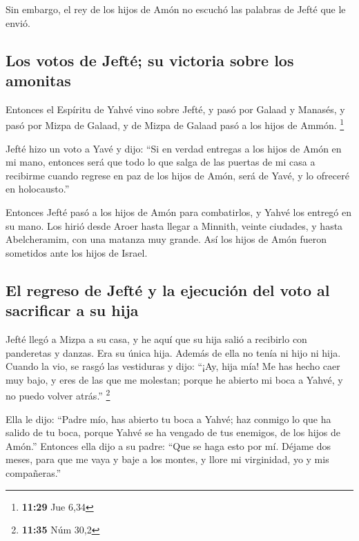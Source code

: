  Sin embargo, el rey de los hijos de Amón no escuchó las
palabras de Jefté que le envió.

\hypertarget{los-votos-de-jeftuxe9-su-victoria-sobre-los-amonitas}{%
\subsection{Los votos de Jefté; su victoria sobre los
amonitas}\label{los-votos-de-jeftuxe9-su-victoria-sobre-los-amonitas}}

 Entonces el Espíritu de Yahvé vino sobre Jefté, y pasó
por Galaad y Manasés, y pasó por Mizpa de Galaad, y de Mizpa de Galaad
pasó a los hijos de Ammón. \footnote{\textbf{11:29} Jue 6,34}

 Jefté hizo un voto a Yavé y dijo: ``Si en verdad
entregas a los hijos de Amón en mi mano,  entonces será
que todo lo que salga de las puertas de mi casa a recibirme cuando
regrese en paz de los hijos de Amón, será de Yavé, y lo ofreceré en
holocausto.''

 Entonces Jefté pasó a los hijos de Amón para
combatirlos, y Yahvé los entregó en su mano.  Los hirió
desde Aroer hasta llegar a Minnith, veinte ciudades, y hasta
Abelcheramim, con una matanza muy grande. Así los hijos de Amón fueron
sometidos ante los hijos de Israel.

\hypertarget{el-regreso-de-jeftuxe9-y-la-ejecuciuxf3n-del-voto-al-sacrificar-a-su-hija}{%
\subsection{El regreso de Jefté y la ejecución del voto al sacrificar a
su
hija}\label{el-regreso-de-jeftuxe9-y-la-ejecuciuxf3n-del-voto-al-sacrificar-a-su-hija}}

 Jefté llegó a Mizpa a su casa, y he aquí que su hija
salió a recibirlo con panderetas y danzas. Era su única hija. Además de
ella no tenía ni hijo ni hija.  Cuando la vio, se rasgó
las vestiduras y dijo: ``¡Ay, hija mía! Me has hecho caer muy bajo, y
eres de las que me molestan; porque he abierto mi boca a Yahvé, y no
puedo volver atrás.'' \footnote{\textbf{11:35} Núm 30,2}

 Ella le dijo: ``Padre mío, has abierto tu boca a Yahvé;
haz conmigo lo que ha salido de tu boca, porque Yahvé se ha vengado de
tus enemigos, de los hijos de Amón.''  Entonces ella dijo
a su padre: ``Que se haga esto por mí. Déjame dos meses, para que me
vaya y baje a los montes, y llore mi virginidad, yo y mis compañeras.''

